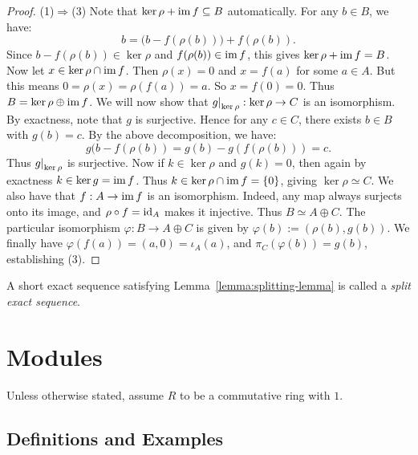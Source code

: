 	\begin{proof}
		(1)$\Rightarrow$(3) Note that $\ker \rho + \operatorname{im} f \subseteq B$ automatically. For any $b \in B$, we have:
		\[
			b = \bigl( b - f(\rho(b)) \bigr) + f(\rho(b)).
		\] 
		Since $b - f(\rho(b)) \in \ker \rho$ and $f(\rho(b)) \in \operatorname{im} f$, this gives $\ker \rho + \operatorname{im} f = B$. Now let $x \in \ker \rho \cap \operatorname{im} f$. Then $\rho(x) = 0$ and $x = f(a)$ for some $a \in A$. But this means $0 = \rho(x) = \rho(f(a)) = a$. So $x = f(0) = 0$. Thus $B = \ker \rho \oplus \operatorname{im} f$. We will now show that $\restr{g}{\ker \rho}:\ker \rho \rightarrow C$ is an isomorphism. By exactness, note that $g$ is surjective. Hence for any $c \in C$, there exists $b \in B$ with $g(b) = c$. By the above decomposition, we have:
		\[
			g(b - f(\rho(b)) = g(b) - g(f(\rho(b))) = c.
		\] 
		Thus $\restr{g}{\ker \rho}$ is surjective. Now if $k \in \ker \rho$ and $g(k) = 0$, then again by exactness $k \in \ker g = \operatorname{im} f$. Thus $k \in \ker \rho \cap \operatorname{im} f = \{0\}$, giving $\ker \rho \simeq C$. We also have that $f:A \rightarrow \operatorname{im} f$ is an isomorphism. Indeed, any map always surjects onto its image, and $\rho \circ f = \operatorname{id}_A$ makes it injective. Thus $B \simeq A \oplus C$. The particular isomorphism $\varphi:B \rightarrow A \oplus C$ is given by $\varphi(b) := (\rho(b),g(b))$. We finally have $\varphi(f(a)) = (a,0) = \iota_A(a)$, and $\pi_C(\varphi(b)) = g(b)$, establishing (3).
	\end{proof}

\begin{definition}
	A short exact sequence satisfying Lemma~\ref{lemma:splitting-lemma} is called a \emph{split exact sequence}.
\end{definition}

\section{Modules}

Unless otherwise stated, assume $R$ to be a commutative ring with $1$.

\subsection{Definitions and Examples}

